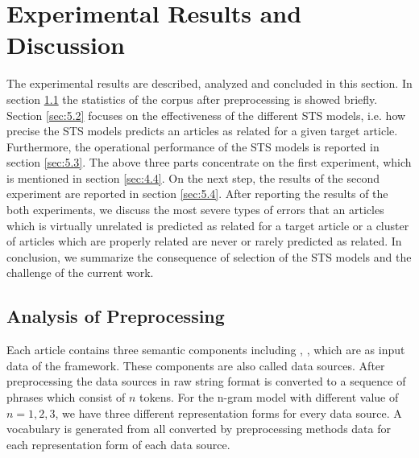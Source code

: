 
\section{Experimental Results and Discussion}
\label{sec:5}

The experimental results are described, analyzed and concluded in this section. In section \ref{sec:5.1} the statistics of the corpus after preprocessing is showed briefly. Section \ref{sec:5.2} focuses on the effectiveness of the different STS models, i.e. how precise the STS models predicts an articles as related for a given target article. Furthermore, the operational performance of the STS models is reported in section \ref{sec:5.3}. The above three parts concentrate on the first experiment, which is mentioned in section \ref{sec:4.4}. On the next step, the results of the second experiment are reported in section \ref{sec:5.4}. After reporting the results of the both experiments, we discuss the most severe types of errors that an articles which is virtually unrelated is predicted as related for a target article or a cluster of articles which are properly related are never or rarely predicted as related. In conclusion, we summarize the consequence of selection of the STS models and the challenge of the current work. 

\subsection{Analysis of Preprocessing}
\label{sec:5.1}

Each article contains three semantic components including \ititle{}, \ititle{}, \isummary{} which are as input data of the framework. These components are also called data sources. After preprocessing the data sources in raw string format is converted to a sequence of phrases which consist of $n$ tokens. For the n-gram model with different value of $n = 1, 2, 3$, we have three different representation forms for every data source. A vocabulary is generated from all converted by preprocessing methods data for each representation form of each data source.

